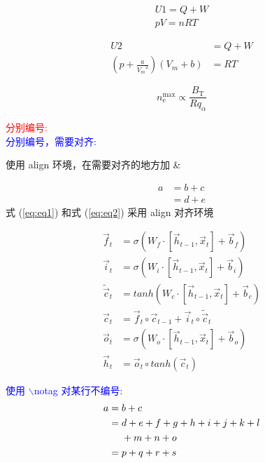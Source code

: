\documentclass[UTF8]{ctexart}
\begin{document}
\begin{gather}
U1 = Q + W \\
pV = nRT
\end{gather}





\begin{align}
U2 &= Q + W \\
(p + \frac{a}{{V_m}^2})(V_m + b) &= RT
\end{align}

\begin{equation}
n_{\mathrm{e}}^{\mathrm{max}} \propto \frac{B_{\mathrm{T}}}{Rq_{\alpha}}
\end{equation}



\textcolor{red}{\Large  分别编号:}\\
\textcolor{blue}{\large 分别编号，需要对齐:}


使用 align 环境，在需要对齐的地方加 \&

\begin{align} 
a & = b + c \label{eq:eq1}
\\[3pt]
& = d + e  \label{eq:eq2}
\end{align}
式 (\ref{eq:eq1}) 和式 (\ref{eq:eq2}) 采用 align 对齐环境

\begin{subequations}
	\begin{align}
	\vec{f}_{t} &= \sigma (W_f \cdot [\vec{h}_{t-1},\vec{x}_t] + \vec{b}_f) \\
	\vec{i}_{t} &= \sigma (W_i \cdot [\vec{h}_{t-1},\vec{x}_t] + \vec{b}_i) \\
	\widetilde{\vec{c}}_t &= tanh (W_c \cdot [\vec{h}_{t-1},\vec{x}_t] + \vec{b}_c) \\
	\vec{c}_t &= \vec{f}_t \circ \vec{c}_{t-1} + \vec{i}_t \circ \widetilde{\vec{c}}_t \\
	\vec{o}_t &= \sigma (W_o \cdot [\vec{h}_{t-1},\vec{x}_t] + \vec{b}_o) \\
	\vec{h}_t &= \vec{o}_t \circ tanh(\vec{c}_t)
	\end{align}
\end{subequations}

\noindent
\textcolor{blue}{\large 使用 $\backslash$notag 对某行不编号:}
\begin{align} 
a = {}& b + c \\ 
= {}& d + e + f + g + h + i + j + k + l \notag \\ 
&{} + m + n + o \\ 
= {}& p + q + r + s 
\end{align}
\end{document}
